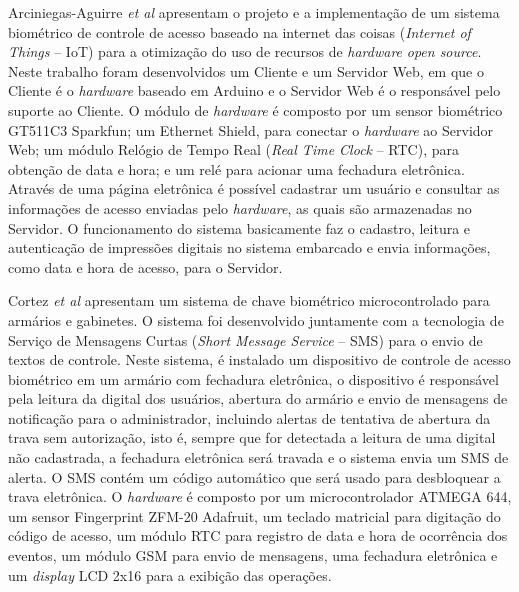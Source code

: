 Arciniegas-Aguirre \textit{et al} \cite{aguirre2015biometric} apresentam o projeto e a implementação de um sistema biométrico de controle de acesso baseado na internet das coisas (\textit{Internet of Things} -- IoT) para a otimização do uso de recursos de \textit{hardware} \textit{open source}. Neste trabalho foram desenvolvidos um Cliente e um Servidor Web, em que o Cliente é o \textit{hardware} baseado em Arduino e o Servidor Web é o responsável pelo suporte ao Cliente. O módulo de \textit{hardware} é composto por um sensor biométrico GT511C3 Sparkfun; um Ethernet Shield, para conectar o \textit{hardware} ao Servidor Web; um módulo Relógio de Tempo Real (\textit{Real Time Clock} -- RTC), para obtenção de data e hora; e um relé para acionar uma fechadura eletrônica. Através de uma página eletrônica é possível cadastrar um usuário e consultar as informações de acesso enviadas pelo \textit{hardware}, as quais são armazenadas no Servidor. O funcionamento do sistema basicamente faz o cadastro, leitura e autenticação de impressões digitais no sistema embarcado e envia informações, como data e hora de acesso, para o Servidor.




 Cortez \textit{et al}\cite{cortez2016development} apresentam um sistema de chave biométrico microcontrolado para armários e gabinetes. O sistema foi desenvolvido juntamente com a tecnologia de Serviço de Mensagens Curtas (\textit{Short Message Service} -- SMS) para o envio de textos de controle. Neste sistema, é instalado um dispositivo de controle de acesso biométrico em um armário com fechadura eletrônica, o dispositivo é responsável pela leitura da digital dos usuários, abertura do armário e envio de mensagens de notificação para o administrador, incluindo alertas de tentativa de abertura da trava sem autorização, isto é, sempre que for detectada a leitura de uma digital não cadastrada, a fechadura eletrônica será travada e o sistema envia um SMS de alerta. O SMS contém um código automático que será usado para desbloquear a trava eletrônica. O \textit{hardware} é composto por um microcontrolador ATMEGA 644, um sensor Fingerprint ZFM-20 Adafruit, um teclado matricial para digitação do código de acesso, um módulo RTC para registro de data e hora de ocorrência dos eventos, um módulo GSM para envio de mensagens, uma fechadura eletrônica e um \textit{display} LCD 2x16 para a exibição das operações.
 
 
 
